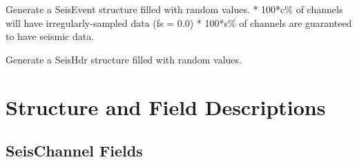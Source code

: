 \documentclass[letterpaper,11pt,english]{sphinxmanual}
\begin{document}
Generate a SeisEvent structure filled with random values.
* 100*c\% of channels  will have irregularly-sampled data (fs = 0.0)
* 100*s\% of channels  are guaranteed to have seismic data.


\begin{fulllineitems}
\end{fulllineitems}


Generate a SeisHdr structure filled with random values.


\section{Structure and Field Descriptions}
\label{\detokenize{src/Appendices/seisdata_fields:structure-and-field-descriptions}}\label{\detokenize{src/Appendices/seisdata_fields::doc}}

\subsection{SeisChannel Fields}
\label{\detokenize{src/Appendices/seisdata_fields:seischannel-fields}}\label{\detokenize{src/Appendices/seisdata_fields:sdf}}
\end{document}
